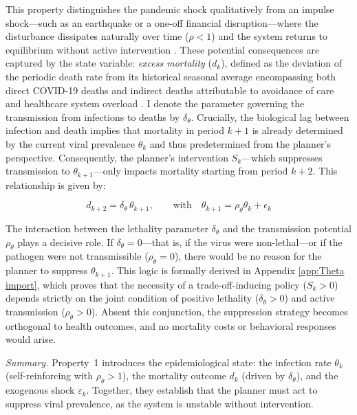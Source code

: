 \documentclass[12pt, a4paper]{article}
\begin{document}
This property distinguishes the pandemic shock qualitatively from an impulse shock---such as an earthquake or a one-off financial disruption---where the disturbance dissipates naturally over time ($\rho < 1$) and the system returns to equilibrium without active intervention \citep{jorda2022longer}. These potential consequences are captured by the state variable: \textit{excess mortality} ($d_k$), defined as the deviation of the periodic death rate from its historical seasonal average encompassing both direct COVID-19 deaths and indirect deaths attributable to avoidance of care and healthcare system overload \citep{Msemburi2023WHO, owid_em}. I denote the parameter governing the transmission from infections to deaths by $\delta_\theta$. Crucially, the biological lag between infection and death implies that mortality in period $k+1$ is already determined by the current viral prevalence $\theta_k$ and thus predetermined from the planner's perspective. Consequently, the planner's intervention $S_k$---which suppresses transmission to $\theta_{k+1}$---only impacts mortality starting from period $k+2$. This relationship is given by:

\begin{equation}
    d_{k+2} = \delta_\theta \, \theta_{k+1}, \qquad \text{with} \quad \theta_{k+1} = \rho_\theta \theta_k+\epsilon_k
    \label{eq:mortality_intro}
\end{equation}

The interaction between the lethality parameter $\delta_\theta$ and the transmission potential $\rho_\theta$ plays a decisive role. If $\delta_\theta = 0$---that is, if the virus were non-lethal---or if the pathogen were not transmissible ($\rho_\theta = 0$), there would be no reason for the planner to suppress $\theta_{k+1}$. This logic is formally derived in Appendix \ref{app:Theta import}, which proves that the necessity of a trade-off-inducing policy ($S_k > 0$) depends strictly on the joint condition of positive lethality ($\delta_\theta > 0$) and active transmission ($\rho_\theta > 0$). Absent this conjunction, the suppression strategy becomes orthogonal to health outcomes, and no mortality costs or behavioral responses would arise.


\medskip
\noindent\textit{Summary.} Property~1 introduces the epidemiological state: the infection rate $\theta_k$ (self-reinforcing with $\rho_\theta > 1$), the mortality outcome $d_k$ (driven by $\delta_\theta$), and the exogenous shock $\varepsilon_k$. Together, they establish that the planner must act to suppress viral prevalence, as the system is unstable without intervention.
\end{document}

